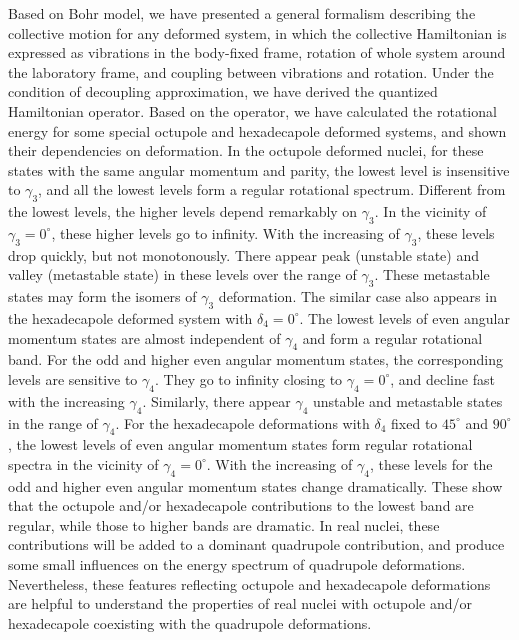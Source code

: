 \documentclass[twocolumn,prc,showpacs,preprintnumbers,superscriptaddress,floatfix]{revtex4}
\begin{document}
Based on Bohr model, we have presented a general formalism describing the
collective motion for any deformed system, in which the collective
Hamiltonian is expressed as vibrations in the body-fixed frame, rotation of
whole system around the laboratory frame, and coupling between vibrations
and rotation. Under the condition of decoupling approximation, we have
derived the quantized Hamiltonian operator. Based on the operator, we have
calculated the rotational energy for some special octupole and hexadecapole
deformed systems, and shown their dependencies on deformation. In the
octupole deformed nuclei, for these states with the same angular momentum
and parity, the lowest level is insensitive to $\gamma _{3}$, and all the
lowest levels form a regular rotational spectrum. Different from the lowest
levels, the higher levels depend remarkably on $\gamma _{3}$. In the
vicinity of $\gamma _{3}=0^{\circ }$, these higher levels go to infinity.
With the increasing of $\gamma _{3}$, these levels drop quickly, but not
monotonously. There appear peak (unstable state) and valley (metastable
state) in these levels over the range of $\gamma _{3}$. These metastable
states may form the isomers of $\gamma _{3}$ deformation. The similar case
also appears in the hexadecapole deformed system with $\delta _{4}=0^{\circ
} $. The lowest levels of even angular momentum states are almost
independent of $\gamma _{4}$ and form a regular rotational band. For the odd
and higher even angular momentum states, the corresponding levels are
sensitive to $\gamma _{4}$. They go to infinity closing to $\gamma
_{4}=0^{\circ }$, and decline fast with the increasing $\gamma _{4}$.
Similarly, there appear $\gamma _{4}$ unstable and metastable states in the
range of $\gamma _{4}$. For the hexadecapole deformations with $\delta _{4}$
fixed to $45^{\circ }$ and $90^{\circ }$, the lowest levels of even angular
momentum states form regular rotational spectra in the vicinity of $\gamma
_{4}=0^{\circ }$. With the increasing of $\gamma _{4}$, these levels for the
odd and higher even angular momentum states change dramatically. These show
that the octupole and/or hexadecapole contributions to the lowest band are
regular, while those to higher bands are dramatic. In real nuclei, these
contributions will be added to a dominant quadrupole contribution, and
produce some small influences on the energy spectrum of quadrupole
deformations. Nevertheless, these features reflecting octupole and
hexadecapole deformations are helpful to understand the properties of real
nuclei with octupole and/or hexadecapole coexisting with the quadrupole
deformations.
\end{document}
